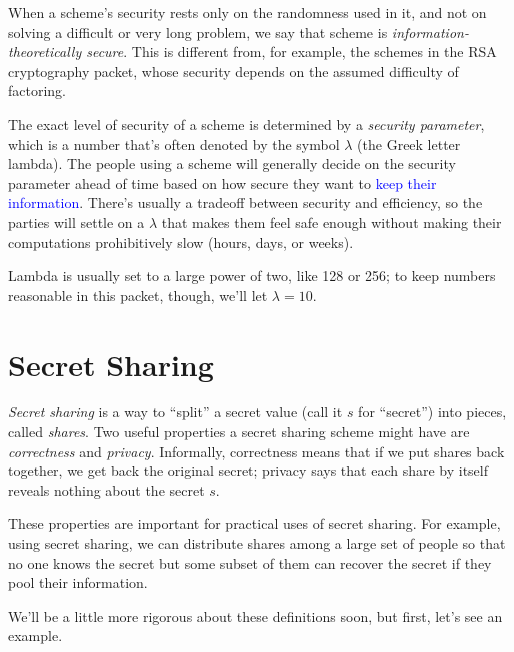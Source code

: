 \documentclass[12 pt]{article}
\newcommand{\new}[1]{\textcolor{blue}{#1}}
\newcounter{example}[section]
\begin{document}
When a scheme's security rests only on the randomness used in it, and not on 
solving a difficult or very long problem, we say that scheme is
\emph{information-theoretically secure}. This is different from, for example,
the schemes in the RSA cryptography packet, whose security depends on 
the assumed difficulty of factoring\footnotemark.


The exact level of security of a scheme is determined by a \emph{security 
parameter}, which is a number that's often denoted by the symbol $\lambda$ 
(the Greek letter lambda). The people using a scheme will generally decide 
on the security parameter ahead of time based on how secure they want to
\new{keep their information}. 
There's usually a tradeoff between security and efficiency, so the 
parties will settle on a $\lambda$ that makes them feel safe enough without 
making their computations prohibitively slow (hours, days, or weeks).

Lambda is usually set to a large power of two, like 128 or 256; to keep 
numbers reasonable in this packet, though, we'll let $\lambda=10$.

\newpage
\section{Secret Sharing}\label{sec:ss}
\emph{Secret sharing} is a way to ``split'' a secret value (call it $s$ for 
``secret'') into pieces, called \emph{shares}. 
Two useful properties a secret sharing scheme might have are \emph{correctness} and 
\emph{privacy}. Informally, correctness means that if we put shares back together, 
we get back the original secret; privacy says that each share by itself reveals 
nothing about the secret $s$. 

These properties are important for practical uses of secret sharing. For 
example, using secret sharing, we can distribute shares among a large set of people so that no one 
knows the secret but some subset of them can recover the secret if they 
pool their information.

We'll be a little more rigorous about these definitions soon, but first, let's 
see an example.  
\end{document}
